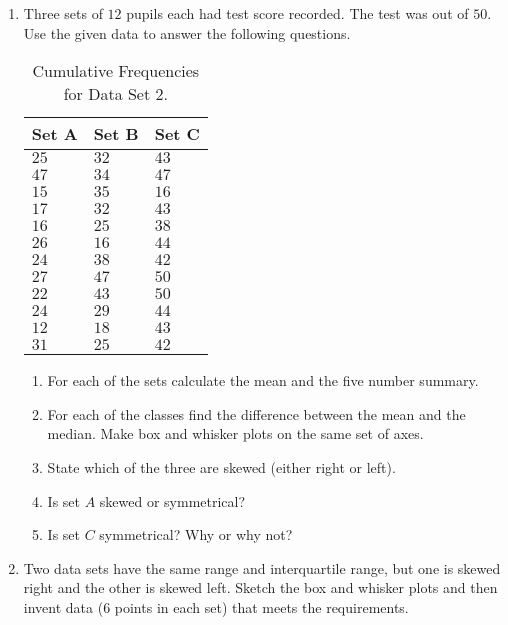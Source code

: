 {
\begin{enumerate}
\item Three sets of $12$ pupils each had test score recorded. The test was out of $50$. Use the given data to answer the following questions.
\begin{table}[htb]
\begin{center}
\begin{tabular}{|l|l|l|}
\hline
Set A & Set B & Set C \bigstrut \\ 
\hline
$25$ & $32$ & $43$ \\
$47$ & $34$ & $47$ \\
$15$ & $35$ & $16$ \\
$17$ & $32$ & $43$ \\
$16$ & $25$ & $38$ \\
$26$ & $16$ & $44$ \\
$24$ & $38$ & $42$ \\
$27$ & $47$ & $50$ \\
$22$ & $43$ & $50$ \\
$24$ & $29$ & $44$ \\
$12$ & $18$ & $43$ \\
$31$ & $25$ & $42 $\\
\hline
\end{tabular}
\caption{Cumulative Frequencies for Data Set 2. \label{tab:mdat:s:cumulativeds2}}
\end{center}
\end{table}
\begin{enumerate}
\item For each of the sets calculate the mean and the five number summary.
\item For each of the classes find the difference between the mean and the median. Make box and whisker plots on the same set of axes.
\item State which of the three are skewed (either right or left).
\item Is set $A$ skewed or symmetrical? 
\item Is set $C$ symmetrical? Why or why not?
\end{enumerate}
\item Two data sets have the same range and interquartile range, but one is skewed right and the other is skewed left. Sketch the box and whisker plots and then invent data ($6$ points in each set) that meets the requirements.
\end{enumerate}
}

